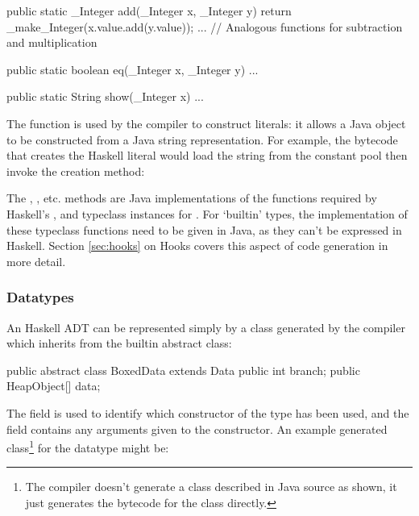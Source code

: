 \documentclass[dissertation.tex]{subfiles}
\begin{document}
{{{\begin{javafigure}
{                public static _Integer add(_Integer x, _Integer y) {
                    return _make_Integer(x.value.add(y.value));
                }
                ... // Analogous functions for subtraction and multiplication

                public static boolean eq(_Integer x, _Integer y) { ... }

                public static String show(_Integer x) { ... }
            }
            \end{javafigure}

            The  function is used by the compiler to construct  literals: it allows a Java  object to be constructed from a Java string representation. For example, the bytecode that creates the Haskell literal  would load the string  from the constant pool then invoke the creation method:


            The , , etc. methods are Java implementations of the functions required by Haskell's ,  and  typeclass instances for . For `builtin' types, the implementation of these typeclass functions need to be given in Java, as they can't be expressed in Haskell. Section \ref{sec:hooks} on Hooks covers this aspect of code generation in more detail.
        }
        \subsubsection{Datatypes}
        {
            An Haskell ADT can be represented simply by a class generated by the compiler which inherits from the  builtin abstract class:

            \begin{javafigure}
            public abstract class BoxedData extends Data {
                public int branch;
                public HeapObject[] data;
            }
            \end{javafigure}

            The  field is used to identify which constructor of the type has been used, and the  field contains any arguments given to the constructor. An example generated class\footnote{The compiler doesn't generate a class described in Java source as shown, it just generates the bytecode for the class directly.} for the datatype  might be:

}}}
\end{document}
